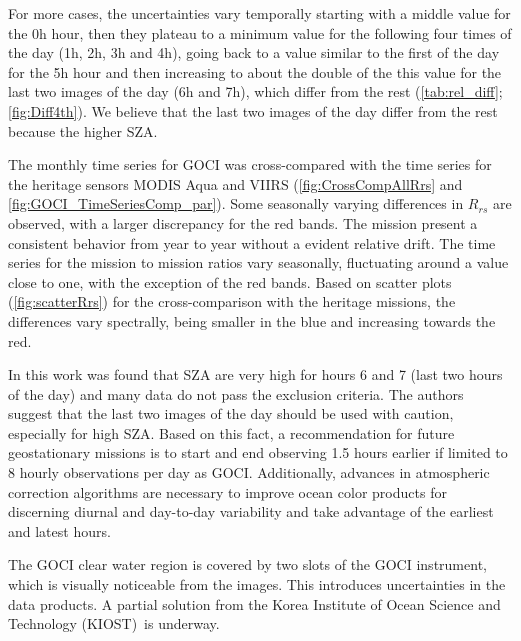 \documentclass[onecolumn,3p,letterpaper,11pt]{elsarticle}
\begin{document}
For more cases, the uncertainties vary temporally starting with a middle value for the 0h hour, then they plateau to a minimum value for the following four times of the day (1h, 2h, 3h and 4h), going back to a value similar to the first of the day for the 5h hour and then increasing to about the double of the this value for the last two images of the day (6h and 7h), which differ from the rest (\autoref{tab:rel_diff};\autoref{fig:Diff4th}). We believe that the last two images of the day differ from the rest because the higher SZA.

The monthly time series for GOCI was cross-compared with the time series for the heritage sensors MODIS Aqua and VIIRS (\autoref{fig:CrossCompAllRrs} and \autoref{fig:GOCI_TimeSeriesComp_par}).
Some seasonally varying differences in $R_{rs}$ are observed, with a larger discrepancy for the red bands. 
The mission present a consistent behavior from year to year without a evident relative drift.
The time series for the mission to mission ratios vary seasonally, fluctuating around a value close to one, with the exception of the red bands.
Based on scatter plots (\autoref{fig:scatterRrs}) for the cross-comparison with the heritage missions, the differences vary spectrally, being smaller in the blue and increasing towards the red. 

In this work was found that SZA are very high for hours 6 and 7 (last two hours of the day) and many data do not pass the exclusion criteria. 
The authors suggest that the last two images of the day should be used with caution, especially for high SZA. 
Based on this fact, a recommendation for future geostationary missions is to start and end observing 1.5 hours earlier if limited to 8 hourly observations per day as GOCI.
Additionally, advances in atmospheric correction algorithms are necessary to improve ocean color products for discerning diurnal and day-to-day variability and take advantage of the earliest and latest hours.

The GOCI clear water region is covered by two slots of the GOCI instrument, which is visually noticeable from the images. This introduces uncertainties in the data products. A partial solution from the Korea Institute of Ocean Science and Technology (KIOST)~is underway.
\end{document}
